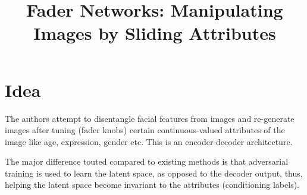 \documentclass[12pt]{article}
\begin{document}
\title{Fader Networks: Manipulating Images by Sliding Attributes}
\author{}
\date{}
\maketitle

\section{Idea}
  The authors attempt to disentangle facial features from images and re-generate images after tuning (fader knobs) certain continuous-valued attributes of the image like age, expression, gender etc. This is an encoder-decoder architecture.

  The major difference touted compared to existing methods is that adversarial training is used to learn the latent space, as opposed to the decoder output, thus, helping the latent space become invariant to the attributes (conditioning labels).
\end{document}
